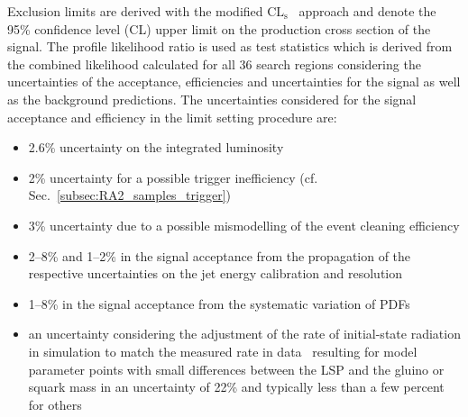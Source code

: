 Exclusion limits are derived with the modified $\mathrm{CL_s}$~\cite{0954-3899-28-10-313, Thomas1999435, bib:Higgs:CLS} approach and denote the 95\% confidence level (CL) upper limit on the production cross section of the signal. The profile likelihood ratio is used as test statistics which is derived from the combined likelihood calculated for all 36 search regions considering the uncertainties of the acceptance, efficiencies and uncertainties for the signal as well as the background predictions. The uncertainties considered for the signal acceptance and efficiency in the limit setting procedure are: 
\begin{itemize} 
\item 2.6\% uncertainty on the integrated luminosity~\cite{CMS-PAS-LUM-13-001}
\item 2\% uncertainty for a possible trigger inefficiency (cf. Sec.~\ref{subsec:RA2_samples_trigger})
\item 3\% uncertainty due to a possible mismodelling of the event cleaning efficiency
\item 2--8\% and 1--2\% in the signal acceptance from the propagation of the respective uncertainties on the jet energy calibration and resolution 
\item 1--8\% in the signal acceptance from the systematic variation of PDFs~\cite{Botje:2011sn} 
\item an uncertainty considering the adjustment of the rate of initial-state radiation in simulation to match the measured rate in data~\cite{isrfsr} resulting for model parameter points with small differences between the LSP and the gluino or squark mass in an uncertainty of 22\% and typically less than a few percent for others  
\end{itemize}
